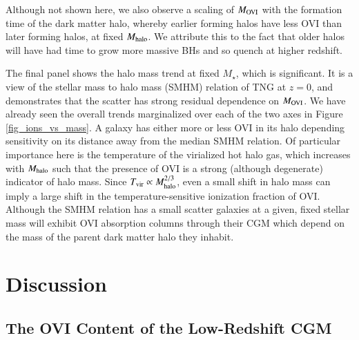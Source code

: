 \documentclass[useAMS,usenatbib]{mnras}
\newcommand{\ovi}{OVI\xspace}
\begin{document}
Although not shown here, we also observe a scaling of $M_{\rm OVI}$ with the formation time of the dark matter halo, whereby earlier forming halos have less \ovi than later forming halos, at fixed $M_{\rm halo}$. We attribute this to the fact that older halos will have had time to grow more massive BHs and so quench at higher redshift.

The final panel shows the halo mass trend at fixed $M_\star$, which is significant. It is a view of the stellar mass to halo mass (SMHM) relation of TNG at $z=0$, and demonstrates that the scatter has strong residual dependence on $M_{\rm OVI}$. We have already seen the overall trends marginalized over each of the two axes in Figure \ref{fig_ions_vs_mass}. A galaxy has either more or less \ovi in its halo depending sensitivity on its distance away from the median SMHM relation. Of particular importance here is the temperature of the virialized hot halo gas, which increases with $M_{\rm halo}$ such that the presence of \ovi is a strong (although degenerate) indicator of halo mass. Since $T_{\rm vir} \propto M_{\rm halo}^{2/3}$, even a small shift in halo mass can imply a large shift in the temperature-sensitive ionization fraction of \ovi. Although the SMHM relation has a small scatter \citep[see][]{pillepich18} galaxies at a given, fixed stellar mass will exhibit \ovi absorption columns through their CGM which depend on the mass of the parent dark matter halo they inhabit.


\section{Discussion} \label{sec_discussion}

\subsection{The \ovi Content of the Low-Redshift CGM}
\end{document}
